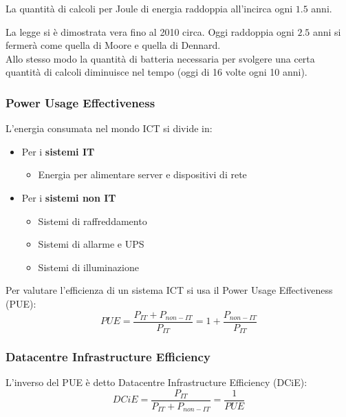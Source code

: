 \begin{definition}
	La quantità di calcoli per Joule di energia raddoppia all'incirca ogni $1.5$ anni.
\end{definition}
La legge si è dimostrata vera fino al 2010 circa. Oggi raddoppia ogni $2.5$ anni si fermerà come quella di Moore e quella di Dennard.\\
Allo stesso modo la quantità di batteria necessaria per svolgere una certa quantità di calcoli diminuisce nel tempo (oggi di 16 volte ogni 10 anni).

\subsubsection{Power Usage Effectiveness}
L'energia consumata nel mondo ICT si divide in:
\begin{itemize}
	\item Per i \textbf{sistemi IT}
	\begin{itemize}
		\item Energia per alimentare server e dispositivi di rete
	\end{itemize}
	\item Per i \textbf{sistemi non IT}
	\begin{itemize}
		\item Sistemi di raffreddamento
		\item Sistemi di allarme e UPS
		\item Sistemi di illuminazione
	\end{itemize}
\end{itemize}
Per valutare l'efficienza di un sistema ICT si usa il Power Usage Effectiveness (PUE):
\begin{equation}
	PUE=\frac{P_{IT}+P_{non-IT}}{P_{IT}} = 1+\frac{P_{non-IT}}{P_{IT}}
\end{equation}

\subsubsection{Datacentre Infrastructure Efficiency}
L'inverso del PUE è detto Datacentre Infrastructure Efficiency (DCiE):
\begin{equation}
	DCiE=\frac{P_{IT}}{P_{IT}+P_{non-IT}}=\frac{1}{PUE}
\end{equation}

